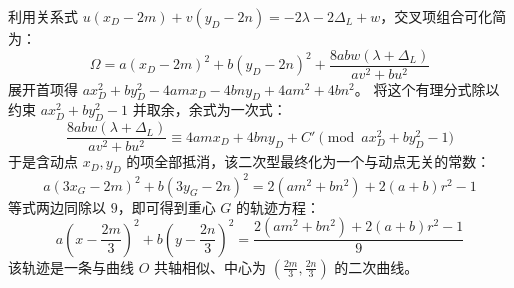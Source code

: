 \begin{solution}
利用关系式 $u(x_D - 2m) + v(y_D - 2n) = -2\lambda - 2\Delta_L + w$，交叉项组合可化简为：
$$ \Omega = a(x_D - 2m)^2 + b(y_D - 2n)^2 + \frac{8abw(\lambda + \Delta_L)}{av^2 + bu^2} $$
展开首项得 $a x_D^2 + b y_D^2 - 4am x_D - 4bn y_D + 4am^2 + 4bn^2$。
将这个有理分式除以约束 $a x_D^2 + b y_D^2 - 1$ 并取余，余式为一次式：
$$ \frac{8abw(\lambda + \Delta_L)}{av^2 + bu^2} \equiv 4am x_D + 4bn y_D + C' \pmod{a x_D^2 + b y_D^2 - 1} $$
于是含动点 $x_D, y_D$ 的项全部抵消，该二次型最终化为一个与动点无关的常数：
$$ a(3x_G - 2m)^2 + b(3y_G - 2n)^2 = 2(am^2 + bn^2) + 2(a+b)r^2 - 1 $$
等式两边同除以 $9$，即可得到重心 $G$ 的轨迹方程：
$$ a\left(x - \frac{2m}{3}\right)^2 + b\left(y - \frac{2n}{3}\right)^2 = \frac{2(am^2 + bn^2) + 2(a+b)r^2 - 1}{9} $$
该轨迹是一条与曲线 $O$ 共轴相似、中心为 $\left(\frac{2m}{3}, \frac{2n}{3}\right)$ 的二次曲线。
\end{solution}




